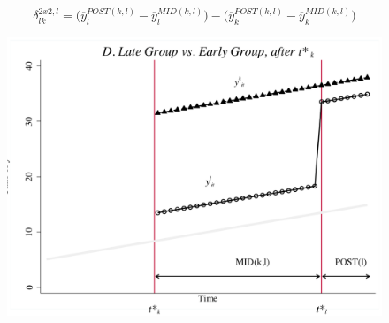 \documentclass{beamer}
\begin{document}
\begin{frame}[plain]
$$\delta_{lk}^{2x2,l} = \bigg ( \overline{y}_l^{POST(k,l)} - \overline{y}_l^{MID(k,l)} \bigg ) - \bigg ( \overline{y}_k^{POST(k,l)} - \overline{y}_k^{MID(k,l)} \bigg ) $$

	\begin{figure}
	\includegraphics[scale=0.5]{./lecture_includes/bacon_goodman_7.png}
	\end{figure}

\end{frame}




\end{document}
